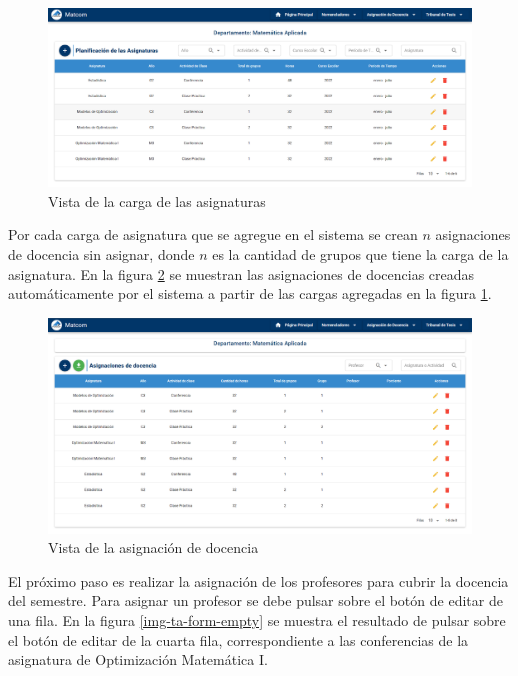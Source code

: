 \begin{figure}[H]
    \includegraphics[scale=0.3]{Graphics/Implementation/Docencia/PD-result.png}
    \caption{Vista de la carga de las asignaturas}
    \label{img-pd-result}
\end{figure}

Por cada carga de asignatura que se agregue en el sistema se crean $n$ asignaciones 
de docencia sin asignar, donde $n$ es la cantidad de grupos que tiene la carga de la asignatura. En 
la figura \ref{img-ta-unassing} se muestran las asignaciones de docencias creadas automáticamente por el sistema 
a partir de las cargas agregadas en la figura \ref{img-pd-result}.

\begin{figure}[H]
    \includegraphics[scale=0.3]{Graphics/Implementation/Docencia/AD-unassing.png}
    \caption{Vista de la asignación de docencia}
    \label{img-ta-unassing}
\end{figure}


El próximo paso es realizar la asignación de los profesores para cubrir 
la docencia del semestre. Para asignar un profesor se debe 
pulsar sobre el botón de editar de una fila. En la figura \ref{img-ta-form-empty} se muestra el resultado 
de pulsar sobre el botón de editar de la cuarta fila, correspondiente a las conferencias
de la asignatura de Optimización Matemática I. 


